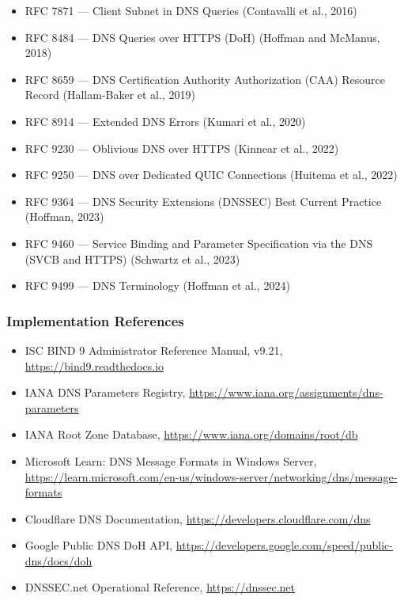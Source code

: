 \documentclass[11pt,letterpaper]{article}
\newcommand{\stageheader}[2]{%
  \noindent\colorbox{#2}{\makebox[\textwidth][l]{%
    \textcolor{white}{\bfseries\sffamily\hspace{6pt}#1\hspace{6pt}}}}%
  \vspace{0.5em}\par%
}
\begin{document}
\begin{itemize}
  \item RFC 7871 --- Client Subnet in DNS Queries (Contavalli et al., 2016)
  \item RFC 8484 --- DNS Queries over HTTPS (DoH) (Hoffman and McManus, 2018)
  \item RFC 8659 --- DNS Certification Authority Authorization (CAA) Resource Record (Hallam-Baker et al., 2019)
  \item RFC 8914 --- Extended DNS Errors (Kumari et al., 2020)
  \item RFC 9230 --- Oblivious DNS over HTTPS (Kinnear et al., 2022)
  \item RFC 9250 --- DNS over Dedicated QUIC Connections (Huitema et al., 2022)
  \item RFC 9364 --- DNS Security Extensions (DNSSEC) Best Current Practice (Hoffman, 2023)
  \item RFC 9460 --- Service Binding and Parameter Specification via the DNS (SVCB and HTTPS) (Schwartz et al., 2023)
  \item RFC 9499 --- DNS Terminology (Hoffman et al., 2024)
\end{itemize}

\subsubsection{Implementation References}

\begin{itemize}
  \item ISC BIND 9 Administrator Reference Manual, v9.21, \url{https://bind9.readthedocs.io}
  \item IANA DNS Parameters Registry, \url{https://www.iana.org/assignments/dns-parameters}
  \item IANA Root Zone Database, \url{https://www.iana.org/domains/root/db}
  \item Microsoft Learn: DNS Message Formats in Windows Server, \url{https://learn.microsoft.com/en-us/windows-server/networking/dns/message-formats}
  \item Cloudflare DNS Documentation, \url{https://developers.cloudflare.com/dns}
  \item Google Public DNS DoH API, \url{https://developers.google.com/speed/public-dns/docs/doh}
  \item DNSSEC.net Operational Reference, \url{https://dnssec.net}
\end{itemize}

\newpage

\stageheader{STAGE 3 --- MISSION PACKAGE}{tertiary}
\end{document}
